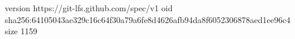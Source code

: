 version https://git-lfs.github.com/spec/v1
oid sha256:64105043ae329c16c64f30a79a6fe8d4626afb94da8f6052306878aed1ee96c4
size 1159
